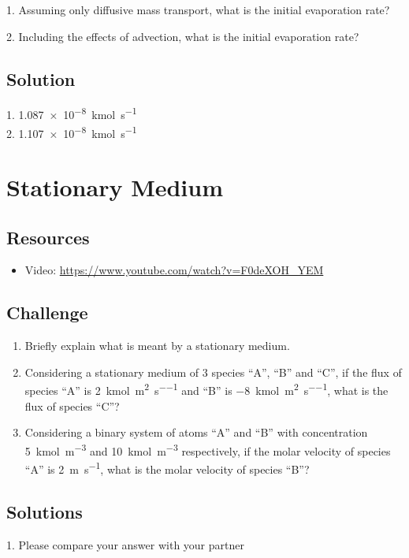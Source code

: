 1. Assuming only diffusive mass transport, what is the initial evaporation rate?

2. Including the effects of advection, what is the initial evaporation rate?


\subsection*{Solution}
1. \SI{1.087e-8}{\kilo\mol\per\second}\\
2. \SI{1.107e-8}{\kilo\mol\per\second}





\newpage
\section{Stationary Medium}

\subsection*{Resources}
\begin{itemize}
    \item Video: \url{https://www.youtube.com/watch?v=F0deXOH_YEM}
\end{itemize}

\subsection*{Challenge}
\begin{enumerate}
    \item Briefly explain what is meant by a stationary medium.
    \item Considering a stationary medium of 3 species ``A'', ``B'' and ``C'', if the flux of species ``A'' is \SI{2}{\kmol\per\square\meter\per\second} and ``B'' is \SI{-8}{\kmol\per\square\meter\per\second}, what is the flux of species ``C''?
    \item Considering a binary system of atoms ``A'' and ``B'' with concentration \SI{5}{\kmol\per\cubic\meter} and \SI{10}{\kmol\per\cubic\meter} respectively, if the molar velocity of species ``A'' is \SI{2}{\meter\per\second}, what is the molar velocity of species ``B''?
\end{enumerate}



\subsection*{Solutions}
1. Please compare your answer with your partner

